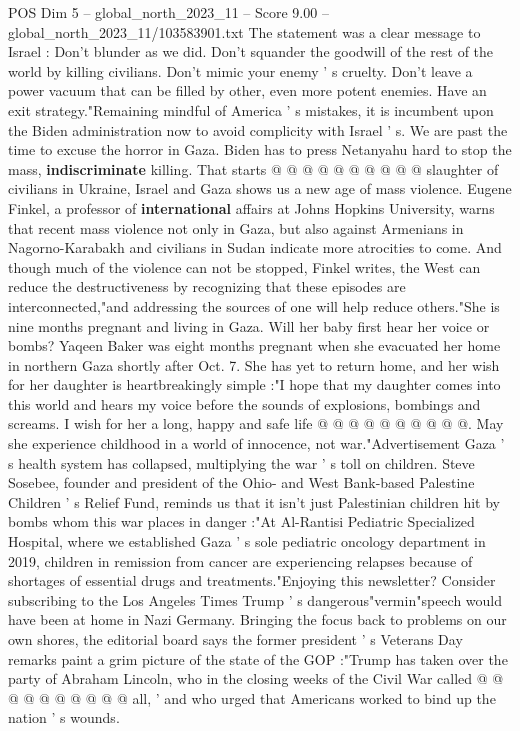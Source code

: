 \begin{textsample}{POS Dim 5 – global\_north\_2023\_11 – Score 9.00 – global\_north\_2023\_11/103583901.txt}
The statement was a clear message to Israel : Don't blunder as we did.
Don't squander the goodwill of the rest of the world by killing civilians.
Don't mimic your enemy ' s cruelty.
Don't leave a power vacuum that can be filled by other, even more potent enemies.
Have an exit strategy."Remaining mindful of America ' s mistakes, it is incumbent upon the Biden administration now to avoid complicity with Israel ' s.
We are past the time to excuse the horror in Gaza.
Biden has to press Netanyahu hard to stop the mass, \textbf{indiscriminate} killing.
That starts @ @ @ @ @ @ @ @ @ @ slaughter of civilians in Ukraine, Israel and Gaza shows us a new age of mass violence.
Eugene Finkel, a professor of \textbf{international} affairs at Johns Hopkins University, warns that recent mass violence not only in Gaza, but also against Armenians in Nagorno-Karabakh and civilians in Sudan indicate more atrocities to come.
And though much of the violence can not be stopped, Finkel writes, the West can reduce the destructiveness by recognizing that these episodes are interconnected,"and addressing the sources of one will help reduce others."She is nine months pregnant and living in Gaza.
Will her baby first hear her voice or bombs?
Yaqeen Baker was eight months pregnant when she evacuated her home in northern Gaza shortly after Oct. 7.
She has yet to return home, and her wish for her daughter is heartbreakingly simple :"I hope that my daughter comes into this world and hears my voice before the sounds of explosions, bombings and screams.
I wish for her a long, happy and safe life @ @ @ @ @ @ @ @ @ @.
May she experience childhood in a world of innocence, not war."Advertisement Gaza ' s health system has collapsed, multiplying the war ' s toll on children.
Steve Sosebee, founder and president of the Ohio- and West Bank-based Palestine Children ' s Relief Fund, reminds us that it isn't just Palestinian children hit by bombs whom this war places in danger :"At Al-Rantisi Pediatric Specialized Hospital, where we established Gaza ' s sole pediatric oncology department in 2019, children in remission from cancer are experiencing relapses because of shortages of essential drugs and treatments."Enjoying this newsletter?
Consider subscribing to the Los Angeles Times Trump ' s dangerous"vermin"speech would have been at home in Nazi Germany.
Bringing the focus back to problems on our own shores, the editorial board says the former president ' s Veterans Day remarks paint a grim picture of the state of the GOP :"Trump has taken over the party of Abraham Lincoln, who in the closing weeks of the Civil War called @ @ @ @ @ @ @ @ @ @ all, ' and who urged that Americans worked to bind up the nation ' s wounds.

\end{textsample}
